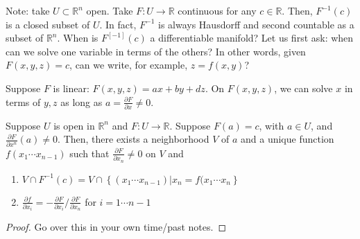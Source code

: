 \documentclass{../mathnotes}
\begin{document}
Note: take $U\subset\mathbb{R}^n$ open. Take $F:U\to\mathbb{R}$ continuous for any $c\in\mathbb{R}$. Then, $F^{-1}(c)$ is a closed subset of $U$. In fact, $F^{-1}$ is always
Hausdorff and second countable as a subset of $\mathbb{R}^n$. When is $F^[-1](c)$ a differentiable manifold? Let us first ask: when can we solve one variable
in terms of the others? In other words, given $F(x,y,z)=c$, can we write, for example, $z=f(x,y)$?

\begin{exmp}
    Suppose $F$ is linear: $F(x,y,z)=ax+by+dz$. On $F(x,y,z)$, we can solve $x$ in terms of $y,z$ as long as $a=\frac{\partial F}{\partial x}\neq 0$.
\end{exmp}

\begin{thm}
    Suppose $U$ is open in $\mathbb{R}^n$ and $F:U\to\mathbb{R}$. Suppose $F(a)=c$, with $a\in U$, and $\frac{\partial F}{\partial x^n}(a)\neq 0$.
    Then, there exists a neighborhood $V$ of $a$ and a unique function $f(x_1\cdots x_{n-1})$ such that $\frac{\partial F}{\partial x_n}\neq0$ on $V$ and
    \begin{enumerate}
        \item $V\cap F^{-1}(c)=V\cap\left\{ (x_1\cdots x_{n-1}) | x_n=f(x_1\cdots x_{n} \right\}$
        \item $\frac{\partial f}{\partial x_i}=-\frac{\partial F}{\partial x_i}/\frac{\partial F}{\partial x_n}$ for $i=1\cdots n-1$
    \end{enumerate}
\end{thm}
\begin{proof}
    Go over this in your own time/past notes.
\end{proof}
\end{document}
